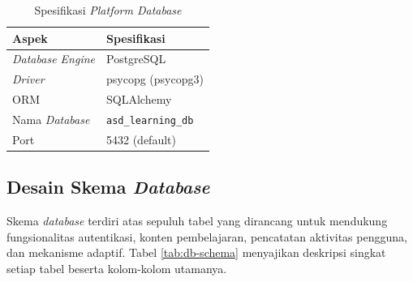 \begin{table}[H]
    \centering
    \caption{Spesifikasi \textit{Platform Database}}
    \label{tab:spek-db}
    \begin{tabular}{|L{4cm}|L{8cm}|}
    \hline
    \textbf{Aspek} & \textbf{Spesifikasi} \\
    \hline
    \textit{Database Engine} & PostgreSQL \\
    \hline
    \textit{Driver} & psycopg (psycopg3) \\
    \hline
    ORM & SQLAlchemy \\
    \hline
    Nama \textit{Database} & \texttt{asd\_learning\_db} \\
    \hline
    Port & 5432 (default) \\
    \hline
    \end{tabular}
\end{table}

\subsection{Desain Skema \textit{Database}}

Skema \textit{database} terdiri atas sepuluh tabel yang dirancang untuk mendukung fungsionalitas autentikasi, konten pembelajaran, pencatatan aktivitas pengguna, dan mekanisme adaptif. Tabel \ref{tab:db-schema} menyajikan deskripsi singkat setiap tabel beserta kolom-kolom utamanya.

